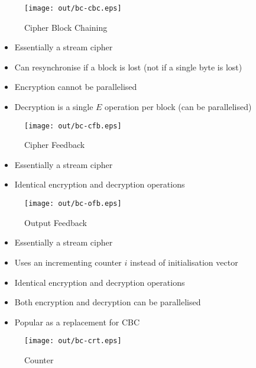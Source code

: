\documentclass[a4paper]{article}
\begin{document}
\begin{figure}[h!]
  \centering
  \texttt{[image: out/bc-cbc.eps]}
  \caption{Cipher Block Chaining}
  \label{fig:bc-cbc}
\end{figure}
\FloatBarrier


\begin{itemize}
  \item Essentially a stream cipher
  \item Can resynchronise if a block is lost (not if a single byte is lost)
  \item Encryption cannot be parallelised
  \item Decryption is a single $E$ operation per block (can be parallelised)
\end{itemize}

\begin{figure}[h!]
  \centering
  \texttt{[image: out/bc-cfb.eps]}
  \caption{Cipher Feedback}
  \label{fig:bc-cfb}
\end{figure}
\FloatBarrier


\begin{itemize}
  \item Essentially a stream cipher
  \item Identical encryption and decryption operations
\end{itemize}

\begin{figure}[h!]
  \centering
  \texttt{[image: out/bc-ofb.eps]}
  \caption{Output Feedback}
  \label{fig:bc-ofc}
\end{figure}
\FloatBarrier


\begin{itemize}
  \item Essentially a stream cipher
  \item Uses an incrementing counter $i$ instead of initialisation vector
  \item Identical encryption and decryption operations
  \item Both encryption and decryption can be parallelised
  \item Popular as a replacement for CBC
\end{itemize}

\begin{figure}[h!]
  \centering
  \texttt{[image: out/bc-crt.eps]}
  \caption{Counter}
  \label{fig:bc-crt}
\end{figure}
\FloatBarrier
\end{document}
